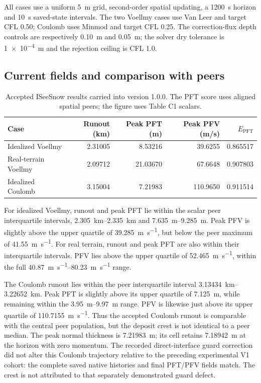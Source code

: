 \documentclass[11pt,a4paper]{article}
\newcommand{\modelversion}{1.0.0}
\begin{document}
All cases use a uniform \SI{5}{\metre} grid, second-order spatial updating,
a \SI{1200}{\second} horizon and \SI{10}{\second} saved-state intervals.
The two Voellmy cases use Van Leer and target CFL 0.50; Coulomb uses Minmod
and target CFL 0.25. The correction-flux depth controls are respectively
\SI{0.10}{\metre} and \SI{0.05}{\metre}; the solver dry tolerance is
\SI{1e-4}{\metre} and the rejection ceiling is CFL 1.0.

\subsection{Current fields and comparison with peers}

\begin{table}[htbp]
\centering
\caption{Accepted ISeeSnow results carried into version \modelversion.
The PFT score uses aligned spatial peers; the figure uses Table C1 scalars.}
\label{tab:iseesnow-current}
\small
\begin{tabular}{lrrrr}
\toprule
Case & Runout (km) & Peak PFT (m) & Peak PFV (m/s) & $E_{\mathrm{PFT}}$\\
\midrule
Idealized Voellmy & 2.31005 & 8.53216 & 39.6255 & 0.865517\\
Real-terrain Voellmy & 2.09712 & 21.03670 & 67.6648 & 0.907803\\
Idealized Coulomb & 3.15004 & 7.21983 & 110.9650 & 0.911514\\
\bottomrule
\end{tabular}
\end{table}

For idealized Voellmy, runout and peak PFT lie within the scalar peer
interquartile intervals, \SIrange{2.305}{2.335}{\kilo\metre} and
\SIrange{7.635}{9.285}{\metre}. Peak PFV is slightly above the upper quartile
of \SI{39.285}{\metre\per\second}, but below the peer maximum of
\SI{41.55}{\metre\per\second}. For real terrain, runout and peak PFT are
also within their interquartile intervals. PFV lies above the upper quartile
of \SI{52.465}{\metre\per\second}, within the full
\SIrange{40.87}{80.23}{\metre\per\second} range.

The Coulomb runout lies within the peer interquartile interval
\SIrange{3.13434}{3.22652}{\kilo\metre}. Peak PFT is slightly above its
upper quartile of \SI{7.125}{\metre}, while remaining within the
\SIrange{3.95}{9.97}{\metre} range. PFV is likewise just above its upper
quartile of \SI{110.7155}{\metre\per\second}. Thus the accepted Coulomb
runout is comparable with the central peer population, but the deposit crest
is not identical to a peer median. The peak normal thickness is
\SI{7.21983}{\metre}; its cell retains \SI{7.18942}{\metre} at the horizon
with zero momentum. The recorded direct-interface guard correction did not
alter this Coulomb trajectory relative to the preceding experimental V1
cohort: the complete saved native histories and final PFT/PFV fields match.
The crest is not attributed to that separately demonstrated guard defect.
\end{document}
